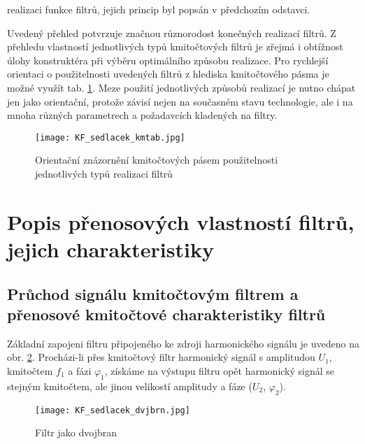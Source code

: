 {\begin{itemize}
                realizaci funkce filtrů, jejich princip byl popsán v předchozím odstavci.
        \end{itemize}
        Uvedený přehled potvrzuje značnou různorodost konečných realizací filtrů. Z přehledu
        vlastností jednotlivých typů kmitočtových filtrů je zřejmá i obtížnost úlohy konstruktéra
        při výběru optimálního způsobu realizace. Pro rychlejší orientaci o použitelnosti
        uvedených filtrů z hlediska kmitočtového pásma je možné využít tab.
        \ref{aes:fig_KF_sedlacek_kmtab}. Meze použití jednotlivých způsobů realizací je nutno chápat
        jen jako orientační, protože závisí nejen na současném stavu technologie, ale i na mnoha
        různých parametrech a požadavcích kladených na filtry.

        \begin{figure}[ht!]
          \centering
          \texttt{[image: KF\_sedlacek\_kmtab.jpg]}
          \caption[Orientační znázornění kmitočtových pásem použitelnosti jednotlivých typů
                   realizaci filtrů]{Orientační znázornění kmitočtových pásem použitelnosti
                   jednotlivých typů realizaci filtrů}
          \label{aes:fig_KF_sedlacek_kmtab}    
        \end{figure} 
  
  \section{Popis přenosových vlastností filtrů, jejich charakteristiky}
    \subsection{Průchod signálu kmitočtovým filtrem a přenosové kmitočtové charakteristiky filtrů}
      Základní zapojeni filtru připojeného ke zdroji harmonického signálu je uvedeno na obr.
      \ref{aes:fig_KF_sedlacek_dvjbrn}. Procházi-li přes kmitočtový filtr harmonický signál s
      amplitudou \(U_1\), kmitočtem \(f_1\) a fázi \(\varphi_1\), získáme na výstupu filtru opět
      harmonický signál se stejným kmitočtem, ale jinou velikostí amplitudy a fáze (\(U_2\),
      \(\varphi_2\)).
  
      \begin{figure}[ht!]
        \centering
        \texttt{[image: KF\_sedlacek\_dvjbrn.jpg]}
        \caption[Filtr jako dvojbran]{Filtr jako dvojbran}
        \label{aes:fig_KF_sedlacek_dvjbrn}    
      \end{figure}
      
}
